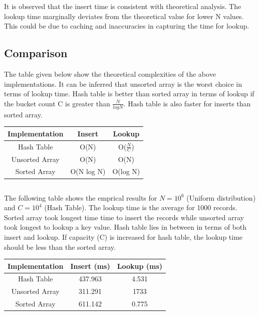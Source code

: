 \documentclass[11pt,a4paper,oneside]{article}
\begin{document}
     It is observed that the insert time is consistent with theoretical analysis. The lookup time marginally deviates from the theoretical value for lower N values. This could be due to caching and inaccuracies in capturing the time for lookup.  
     
    \subsection{Comparison}
    The table given below show the theoretical complexities of the above implementations. It can be inferred that unsorted array is the worst choice in terms of lookup time. Hash table is better than sorted array in terms of lookup if the bucket count C is greater than $\frac{N}{log N}$. Hash table is also faster for inserts than sorted array. \\
    \newline
     \begin{center}
     	\begin{tabular}{|c|c|c|}
     		\hline 
     		\textbf{Implementation} & \textbf{Insert} & \textbf{Lookup} \\
     		\hline
     		Hash Table & O(N) & O($\frac{N}{C}$) \\ 
     		\hline 
     		Unsorted Array & O(N) & O(N)\\ 
     		\hline 
     		Sorted Array & O(N log N) & O(log N)\\ 
     		\hline 
     	\end{tabular}
     \end{center}
    \begin{verbatim}
    \end{verbatim}
     The following table shows the emprical results for $N = 10^6$ (Uniform distribution) and $C = 10^4$ (Hash Table). The lookup time is the average for 1000 records. Sorted array took longest time time to insert the records while unsorted array took longest to lookup a key value. Hash table lies in between in terms of both insert and lookup. If capacity (C) is increased for hash table, the lookup time should be less than the sorted array. \\
     \newline
	 \begin{center}
	 	\begin{tabular}{|c|c|c|}
	 		\hline 
	 		\textbf{Implementation} & \textbf{Insert (ms)} & \textbf{Lookup (ms)} \\
	 		\hline
	 		Hash Table & 437.963 & 4.531 \\ 
	 		\hline 
	 		Unsorted Array & 311.291 & 1733 \\ 
	 		\hline 
	 		Sorted Array & 611.142 & 0.775 \\ 
	 		\hline 
	 	\end{tabular}
	 \end{center}
    \begin{verbatim}
          
    \end{verbatim}     
\end{document}

